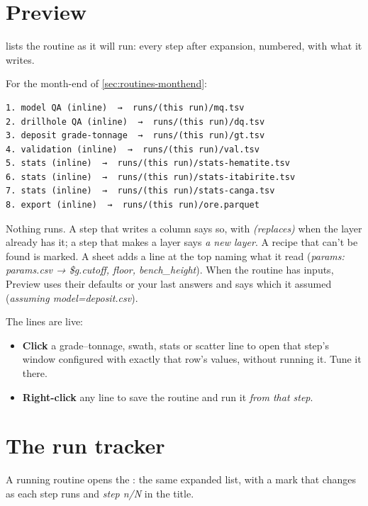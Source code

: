\section{Preview}\label{sec:routines-preview}
 lists the routine as it will run: every step after expansion, numbered, with what it writes.

For the month-end of \cref{sec:routines-monthend}:

\begin{lstlisting}
1. model QA (inline)  →  runs/(this run)/mq.tsv
2. drillhole QA (inline)  →  runs/(this run)/dq.tsv
3. deposit grade-tonnage  →  runs/(this run)/gt.tsv
4. validation (inline)  →  runs/(this run)/val.tsv
5. stats (inline)  →  runs/(this run)/stats-hematite.tsv
6. stats (inline)  →  runs/(this run)/stats-itabirite.tsv
7. stats (inline)  →  runs/(this run)/stats-canga.tsv
8. export (inline)  →  runs/(this run)/ore.parquet
\end{lstlisting}

Nothing runs. A step that writes a column says so, with \emph{(replaces)} when the layer already has it; a step that makes a layer says \emph{a new layer}. A recipe that can't be found is marked. A  sheet adds a line at the top naming what it read (\emph{params: params.csv → \$g.cutoff, floor, bench\_height}). When the routine has inputs, Preview uses their defaults or your last answers and says which it assumed (\emph{assuming model=deposit.csv}).

The lines are live:

\begin{itemize}
\item \textbf{Click} a grade–tonnage, swath, stats or scatter line to open that step's window configured with exactly that row's values, without running it. Tune it there.
\item \textbf{Right-click} any line to save the routine and run it \emph{from that step}.
\end{itemize}

\section{The run tracker}\label{sec:routines-tracker}
A running routine opens the : the same expanded list, with a mark that changes as each step runs and \emph{step n/N} in the title.


